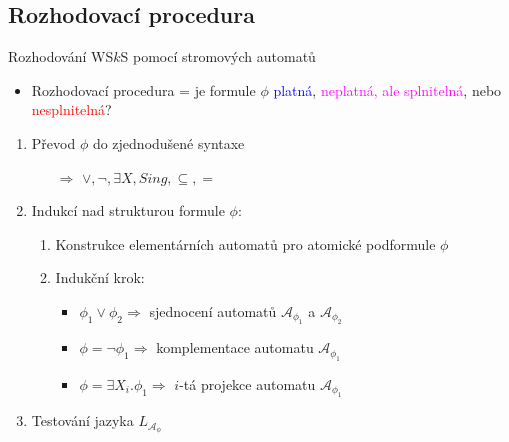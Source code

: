 \documentclass{beamer}
\begin{document}
	\subsection{Rozhodovací procedura}
	\begin{frame}{Rozhodování WS$k$S pomocí stromových automatů}
	 \begin{itemize}
	   \item Rozhodovací procedura = je formule $\phi$ \textcolor{blue}{platná},
	   \textcolor{magenta}{neplatná, ale splnitelná}, nebo
	   \textcolor{red}{nesplnitelná}?
	 \end{itemize}
	 \begin{enumerate}
	   \pause
	   \item Převod $\phi$ do zjednodušené syntaxe
	   \begin{itemize}
	     \item[$\Rightarrow$] $\vee, \neg, \exists X, Sing, \subseteq, =$
	   \end{itemize}
	   \pause
	   \item Indukcí nad strukturou formule $\phi$:
	   \begin{enumerate}
	   \pause
	     \item Konstrukce elementárních automatů pro atomické podformule $\phi$
	   \pause
	     \item Indukční krok:
	     \begin{itemize}
	   \pause
	       \item $\phi_1 \vee \phi_2 \Rightarrow$ sjednocení automatů
	       $\mathcal{A}_{\phi_1}$ a $\mathcal{A}_{\phi_2}$
	   \pause
	       \item $\phi = \neg\phi_1 \Rightarrow$ komplementace automatu
	       $\mathcal{A}_{\phi_1}$
	   \pause
	       \item $\phi = \exists X_i.\phi_1 \Rightarrow$ $i$-tá projekce automatu
	       $\mathcal{A}_{\phi_1}$
	   \pause
	     \end{itemize}
	   \end{enumerate}
	   \item Testování jazyka $L_{\mathcal{A}_\phi}$
	 \end{enumerate}
	\end{frame}
	
\end{document}
